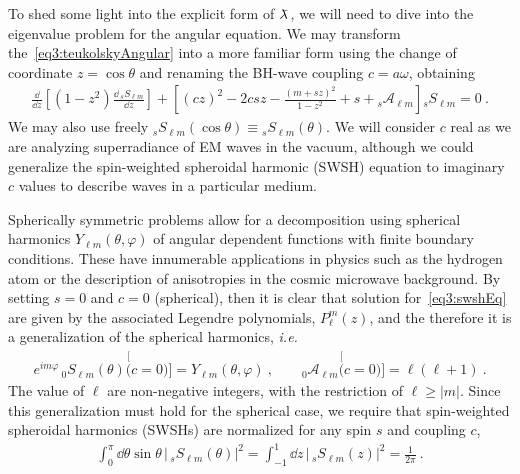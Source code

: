 To shed some light into the explicit form of $\lambdabar$, we will need to dive into the eigenvalue problem for the angular equation. We may transform the~\eqref{eq3:teukolskyAngular} into a more familiar form using the change of coordinate $z=\cos\theta$ and renaming the BH-wave coupling $c=a \omega$, obtaining
\begin{align}
    \frac{\dd}{\dd z} \left[ (1-z^2) \frac{\dd\, {}_{s}S_{\ell m}}{\dd z} \right] + \left[ (c z)^2 - 2 c s z  -\frac{(m + s z)^2}{1 - z^2} + s  + {}_{s}\mathscr{A}_{\ell m} \right] {}_{s}S_{\ell m} = 0 ~.
    \label{eq3:swshEq}
\end{align}
We may also use freely ${}_{s}S_{\ell m}(\cos\theta) \equiv {}_{s}S_{\ell m}(\theta)$.
We will consider $c$ real as we are analyzing superradiance of EM waves in the vacuum, although we could generalize the spin-weighted spheroidal harmonic (SWSH) equation to imaginary $c$ values to describe waves in a particular medium.

Spherically symmetric problems allow for a decomposition using spherical harmonics $Y_{\ell m}(\theta,\varphi)$ of angular dependent functions with finite boundary conditions.
These have innumerable applications in physics such as the hydrogen atom or the description of anisotropies in the cosmic microwave background.
By setting $s=0$ and $c=0$ (spherical), then it is clear that solution for~\eqref{eq3:swshEq} are given by the associated Legendre polynomials, $P^m_\ell(z)$, and the therefore it is a generalization of the spherical harmonics, \emph{i.e.}
\begin{align}
    e^{i m \varphi} \,{}_{0}S_{\ell m}(\theta) \stackrel[(c=0)]{}{=} Y_{\ell m}(\theta,\varphi) ~,\qquad {}_{0}\mathscr{A}_{\ell m} \stackrel[(c=0)]{}{=} \ell (\ell + 1) ~.
\end{align}
The value of $\ell$ are non-negative integers, with the restriction of $\ell \ge |m|$. 
Since this generalization must hold for the spherical case, we require that spin-weighted spheroidal harmonics (SWSHs) are normalized for any spin $s$ and coupling $c$,
\begin{align}
    \int_{0}^\pi \dd\theta \sin\theta \, | \,{}_{s}S_{\ell m}(\theta) |^2 =
    \int_{-1}^{1} \dd z  \, | \,{}_{s}S_{\ell m}(z) |^2 = \frac{1}{2\pi} ~.
\end{align}

